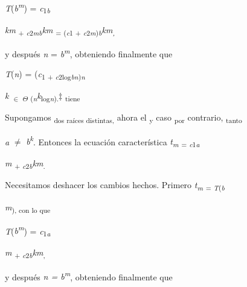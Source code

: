 \documentclass[12pt]{article}
\renewcommand{\_}{\kern-1.5pt\textunderscore\kern-1.5pt}
\begin{document}
{\fontsize{10pt}{12.0pt}\selectfont \textit{T}(\textit{b\textsuperscript{m}}) = \textit{c}\textsubscript{1\textit{b}}{\fontsize{7pt}{8.4pt}\selectfont \textit{km }\textsubscript{+ \textit{c}2\textit{mb}}\textit{km }\textsubscript{= (\textit{c}1 + \textit{c}2\textit{m})\textit{b}}\textit{km\textsubscript{, }}{\fontsize{10pt}{12.0pt}\selectfont y después \textit{n }= \textit{b\textsuperscript{m}}, obteniendo finalmente que \par}\par}\par}\par

{\fontsize{10pt}{12.0pt}\selectfont \textit{T}(\textit{n}) = (\textit{c}\textsubscript{1 + \textit{c}2log\textit{bn})\textit{n}}{\fontsize{7pt}{8.4pt}\selectfont \textit{k }\textsubscript{$ \in $  $ \Theta $ (\textit{n}}\textit{k}\textsubscript{log\textit{n}).}$\ddag$  \textsubscript{tiene }{\fontsize{10pt}{12.0pt}\selectfont Supongamos \textsubscript{dos raíces distintas, }ahora el \textsubscript{y }caso \textsubscript{por }contrario, \textsubscript{tanto }\par}\par}\par}\par

{\fontsize{10pt}{12.0pt}\selectfont \textit{a }$ \neq $  \textit{b\textsuperscript{k}}. Entonces la ecuación característica \textit{t\textsubscript{m }}\textsubscript{= \textit{c}1\textit{a}}{\fontsize{7pt}{8.4pt}\selectfont \textit{m }\textsubscript{+ \textit{c}2\textit{b}}\textit{km}\textsubscript{. }{\fontsize{10pt}{12.0pt}\selectfont Necesitamos deshacer los cambios hechos. Primero \textit{t\textsubscript{m }}\textsubscript{= \textit{T}(\textit{b}}{\fontsize{7pt}{8.4pt}\selectfont \textit{m}\textsubscript{), con lo que }\par}\par}\par}\par}\par

{\fontsize{10pt}{12.0pt}\selectfont \textit{T}(\textit{b\textsuperscript{m}}) = \textit{c}\textsubscript{1\textit{a}}{\fontsize{7pt}{8.4pt}\selectfont \textit{m }\textsubscript{+ \textit{c}2\textit{b}}\textit{km}\textsubscript{, }{\fontsize{10pt}{12.0pt}\selectfont y después \textit{n = b\textsuperscript{m}}, obteniendo finalmente que \par}\par}\par}\par
\end{document}
